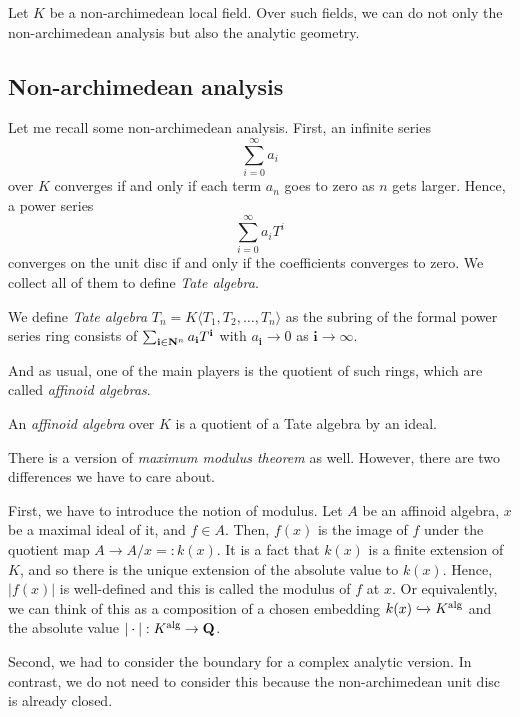 \documentclass{amsart}
\begin{document}
Let $K$ be a non-archimedean local field. Over such fields, we can do not only the non-archimedean analysis but also the analytic geometry.

\subsection{Non-archimedean analysis}

Let me recall some non-archimedean analysis. First, an infinite series
$$ \sum_{i=0}^\infty a_i $$
over $K$ converges if and only if each term $a_n$ goes to zero as $n$ gets larger. Hence, a power series
$$ \sum_{i=0}^\infty a_i T^i $$
converges on the unit disc if and only if the coefficients converges to zero. We collect all of them to define \textit{Tate algebra}.

\begin{defn}
    We define \textit{Tate algebra} $T_n = K \langle T_1, T_2, \dots, T_n \rangle$ as the subring of the formal power series ring consists of $\sum_{\mathbf i \in \mathbf{N}^n} a_{\mathbf i} T^{\mathbf i}$ with $a_{\mathbf i} \to 0$ as $\mathbf i \to \infty$.
\end{defn}

And as usual, one of the main players is the quotient of such rings, which are called \textit{affinoid algebras}.

\begin{defn}
    An \textit{affinoid algebra} over $K$ is a quotient of a Tate algebra by an ideal.
\end{defn}

There is a version of \textit{maximum modulus theorem} as well. However, there are two differences we have to care about.

First, we have to introduce the notion of modulus. Let $A$ be an affinoid algebra, $x$ be a maximal ideal of it, and $f \in A$. Then, $f(x)$ is the image of $f$ under the quotient map $A \to A/x =: k(x)$. It is a fact that $k(x)$ is a finite extension of $K$, and so there is the unique extension of the absolute value to $k(x)$. Hence, $|f(x)|$ is well-defined and this is called the modulus of $f$ at $x$. Or equivalently, we can think of this as a composition of a chosen embedding $k(x) \xhookrightarrow{} K^{\operatorname{alg}}$ and the absolute value $| \cdot |: K^{\operatorname{alg}} \to \mathbf{Q}$.

Second, we had to consider the boundary for a complex analytic version. In contrast, we do not need to consider this because the non-archimedean unit disc is already closed.
\end{document}

